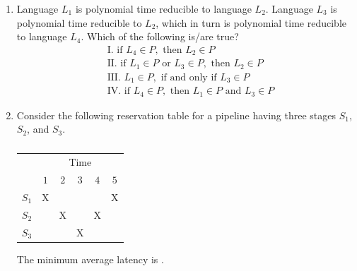 \documentclass[journal,12pt,onecolumn]{IEEEtran}
\theoremstyle{remark}
\begin{document}
\begin{enumerate}
				\hfill{}
				
				\item Language $L_1$ is polynomial time reducible to language $L_2$. Language $L_3$ is polynomial time reducible to $L_2$, which in turn is polynomial time reducible to language $L_4$. Which of the following is/are true?
				\begin{align*}
					&\text{I. if } L_4 \in P, \text{ then } L_2 \in P\\
					&\text{II. if } L_1 \in P \text{ or } L_3 \in P, \text{ then } L_2 \in P\\
					&\text{III. } L_1 \in P, \text{ if and only if } L_3 \in P\\
					&\text{IV. if } L_4 \in P, \text{ then } L_1 \in P \text{ and } L_3 \in P
				\end{align*}
				
				\hfill{}
				
				\begin{enumerate}
				\end{enumerate}
				
				\item Consider the following reservation table for a pipeline having three stages $S_1$, $S_2$, and $S_3$.
				
				\begin{table}[h]
					\centering
					\caption*{}
					\label{tab:reservation}
					\begin{tabular}{|c|c|c|c|c|c|}
						\hline
						& \multicolumn{5}{c|}{Time} \\
						\cline{2-6}
						& $1$ & $2$ & $3$ & $4$ & $5$ \\
						\hline
						$S_1$ & X & &   & & X \\
						\hline
						$S_2$ & & X & & X & \\
						\hline
						$S_3$ & & & X & & \\
						\hline
					\end{tabular}
				\end{table}
				
				The minimum average latency  is \underline{\hspace{2cm}}.
				

\end{enumerate}
\end{document}
